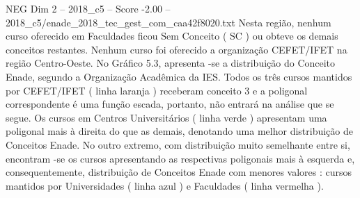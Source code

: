 \begin{textsample}{NEG Dim 2 – 2018\_c5 – Score -2.00 – 2018\_c5/enade\_2018\_tec\_gest\_com\_caa42f8020.txt}
Nesta região, nenhum curso oferecido em Faculdades ficou Sem Conceito ( SC ) ou obteve os demais conceitos restantes.
Nenhum curso foi oferecido a organização CEFET/IFET na região Centro-Oeste.
No Gráfico 5.3, apresenta -se a distribuição do Conceito Enade, segundo a Organização Acadêmica da IES.
Todos os três cursos mantidos por CEFET/IFET ( linha laranja ) receberam conceito 3 e a poligonal correspondente é uma função escada, portanto, não entrará na análise que se segue.
Os cursos em Centros Universitários ( linha verde ) apresentam uma poligonal mais à direita do que as demais, denotando uma melhor distribuição de Conceitos Enade.
No outro extremo, com distribuição muito semelhante entre si, encontram -se os cursos apresentando as respectivas poligonais mais à esquerda e, consequentemente, distribuição de Conceitos Enade com menores valores : cursos mantidos por Universidades ( linha azul ) e Faculdades ( linha vermelha ).

\end{textsample}
